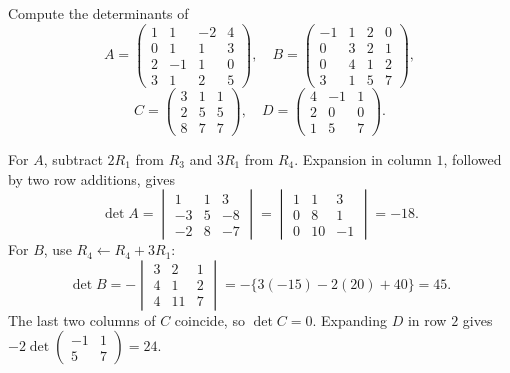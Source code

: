 \begin{problem}\label{ex:07:four}
Compute the determinants of
\[
 A=\begin{pmatrix}1&1&-2&4\\0&1&1&3\\2&-1&1&0\\3&1&2&5\end{pmatrix},
 \quad B=\begin{pmatrix}-1&1&2&0\\0&3&2&1\\0&4&1&2\\3&1&5&7\end{pmatrix},
\]
\[
 C=\begin{pmatrix}3&1&1\\2&5&5\\8&7&7\end{pmatrix},
 \quad D=\begin{pmatrix}4&-1&1\\2&0&0\\1&5&7\end{pmatrix}.
\]
\end{problem}
\begin{solution}
For \(A\), subtract \(2R_1\) from \(R_3\) and \(3R_1\) from \(R_4\).
Expansion in column \(1\), followed by two row additions, gives
\[
 \det A=\begin{vmatrix}1&1&3\\-3&5&-8\\-2&8&-7\end{vmatrix}
 =\begin{vmatrix}1&1&3\\0&8&1\\0&10&-1\end{vmatrix}=-18.
\]
For \(B\), use \(R_4\leftarrow R_4+3R_1\):
\[
 \det B=-\begin{vmatrix}3&2&1\\4&1&2\\4&11&7\end{vmatrix}
 =-\{3(-15)-2(20)+40\}=45.
\]
The last two columns of \(C\) coincide, so \(\det C=0\).
Expanding \(D\) in row \(2\) gives
\(-2\det\begin{pmatrix}-1&1\\5&7\end{pmatrix}=24\).
\end{solution}

